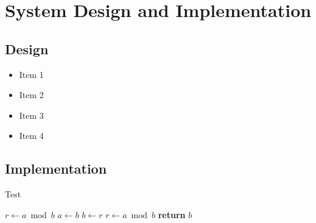 %
\chapter{System Design and Implementation}
\label{sec:system}


\Blindtext[1][1]
\cite{WEB:GNU:GPL:2010}

\section{Design}
\label{sec:system:sec0}

\Blindtext[1][1]

\begin{itemize}[noitemsep]
\item Item 1
\item Item 2
\item Item 3
\item Item 4
\end{itemize}

\Blindtext[1][1]

\section{Implementation}
\label{sec:system:sec1}

\Blindtext[1][1]

\begin{algorithm}
\caption{Test}\label{alg:test}
\begin{algorithmic}[1]
\State $r\gets a\bmod b$
\State $a\gets b$
\State $b\gets r$
\State $r\gets a\bmod b$
\EndWhile\label{euclidendwhile}
\State \textbf{return} $b$
\EndProcedure
\end{algorithmic}
\end{algorithm}

\Blindtext[1][1]
